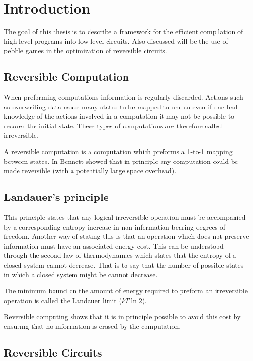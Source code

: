 \chapter{Introduction}

The goal of this thesis is to describe a framework for the efficient
compilation of high-level programs into low level circuits. Also discussed will
be the use of pebble games in the optimization of reversible circuits.

\section{Reversible Computation}

When preforming computations information is regularly discarded. Actions such
as overwriting data cause many states to be mapped to one so even if one had
knowledge of the actions involved in a computation it may not be possible to
recover the initial state. These types of computations are therefore called
irreversible.

A reversible computation is a computation which preforms a 1-to-1 mapping
between states. In \cite{Bennett:73} Bennett showed that in principle any
computation could be made reversible (with a potentially large space overhead).

\section{Landauer's principle}

This principle\cite{landauer61} states that any logical irreversible operation
must be accompanied by a corresponding entropy increase in non-information
bearing degrees of freedom. Another way of stating this is that an operation
which does not preserve information must have an associated energy cost. This
can be understood through the second law of thermodynamics which states that
the entropy of a closed system cannot decrease. That is to say that the number
of possible states in which a closed system might be cannot decrease.

The minimum bound on the amount of energy required to preform an irreversible
operation is called the Landauer limit ($kT\ln 2$).

Reversible computing shows that it is in principle possible to avoid this cost
by ensuring that no information is erased by the computation.

\section{Reversible Circuits}

